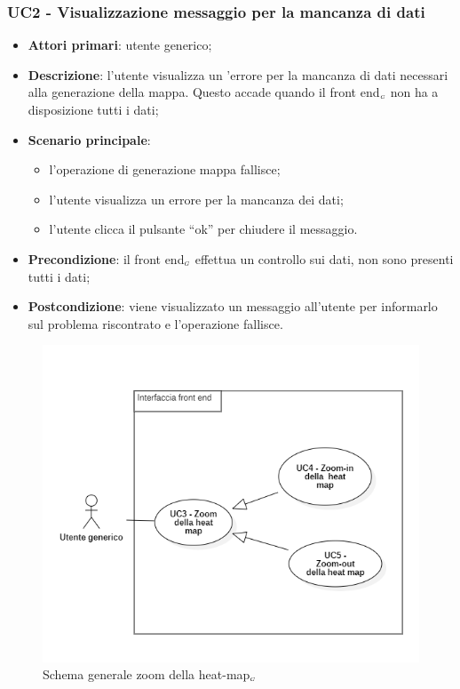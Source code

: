 \subsubsection{UC2 - Visualizzazione messaggio per la mancanza di dati }\label{CasiDUsoCasiDUsoTraUnUtenteEIlFrontEndElencoCasiDUsoUC2VisualizzazioneMessaggioPerLaMancanzaDiDati} %
\begin{itemize}
	\item \textbf{Attori primari}: utente generico;
	\item \textbf{Descrizione}: l’utente visualizza un  ’errore per la mancanza di dati necessari alla generazione della mappa. Questo accade quando il front end$_{\scaleto{G}{3pt}}$ non ha a disposizione tutti i dati;
	\item \textbf{Scenario principale}:
	\begin{itemize}
		\item l’operazione di generazione mappa fallisce;
		\item l’utente visualizza un errore per la mancanza dei dati;
		\item l’utente clicca il pulsante “ok” per chiudere il messaggio.
	\end{itemize}
	\item \textbf{Precondizione}: il front end$_{\scaleto{G}{3pt}}$ effettua un controllo sui dati, non sono presenti tutti i dati;
	\item \textbf{Postcondizione}: viene visualizzato un messaggio all’utente per informarlo sul problema riscontrato e l’operazione fallisce.
\end{itemize}


\begin{center}
	\begin{figure}[H]
		\centering\includegraphics[scale=0.8]{../immagini/attori_casi/UC_3_4_5.png}
		\caption{Schema generale zoom della heat-map$_{\scaleto{G}{3pt}}$}
	\end{figure}
\end{center}


